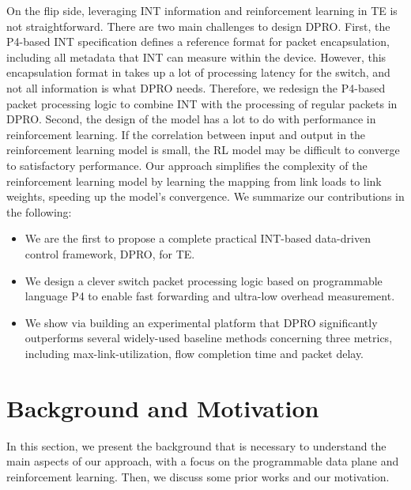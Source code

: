 \documentclass[10pt,conference]{IEEEtran}
\begin{document}
On the flip side, leveraging INT information and reinforcement learning in TE is not straightforward. There are two main challenges to design DPRO. First, the P4-based INT specification\cite{kim2015band} defines a reference format for packet encapsulation, including all metadata that INT can measure within the device. However, this encapsulation format in \cite{kim2015band} takes up a lot of processing latency for the switch, and not all information is what DPRO needs. Therefore, we redesign the P4-based packet processing logic to combine INT with the processing of regular packets in DPRO. Second, the design of the model has a lot to do with performance in reinforcement learning. If the correlation between input and output in the reinforcement learning model is small, the RL model may be difficult to converge to satisfactory performance. Our approach simplifies the complexity of the reinforcement learning model by learning the mapping from link loads to link weights, speeding up the model's convergence.
We summarize our contributions in the following:
\begin{itemize}
\item We are the first to propose a complete practical INT-based data-driven control framework, DPRO, for TE.
\item We design a clever switch packet processing logic based on programmable language P4 to enable fast forwarding and ultra-low overhead measurement.
\item We show via building an experimental platform that DPRO significantly outperforms several widely-used baseline methods concerning three metrics, including max-link-utilization, flow completion time and packet delay.
\end{itemize}

\section{Background and Motivation}
In this section, we present the background that is necessary to understand the main aspects of our approach, with a focus on the programmable data plane and reinforcement learning. Then, we discuss some prior works and our motivation.
\end{document}
